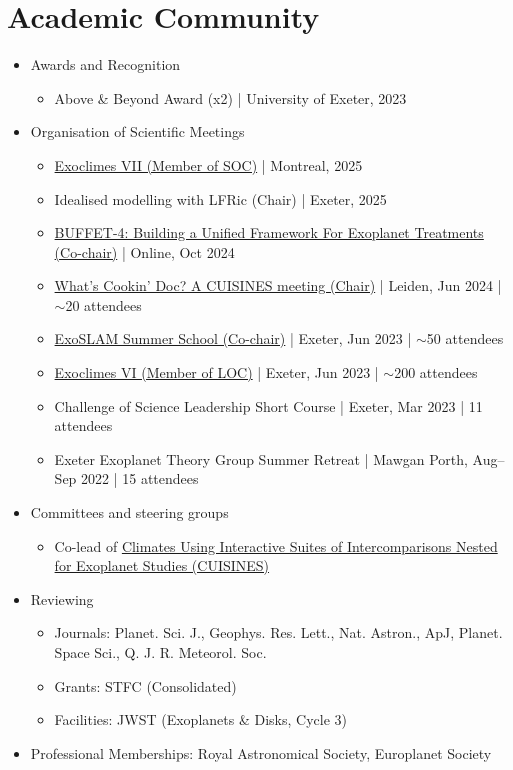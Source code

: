 \documentclass[a4paper, 11pt]{article}
\newcommand{\tbc}[1]{\textcolor{exeter_stone_grey}{#1}}
\begin{document}
\section{Academic Community}
\begin{itemize}[nosep, leftmargin=10pt]
    \item Awards and Recognition
    \begin{itemize}
        \item Above \& Beyond Award (x2) | University of Exeter, 2023
    \end{itemize}
    \item Organisation of Scientific Meetings
    \begin{itemize}
        \item \tbc{\href{https://exoclimes.org}{Exoclimes VII (Member of SOC)} | Montreal, 2025}
        \item \tbc{Idealised modelling with LFRic (Chair) | Exeter, 2025}
        \item \tbc{\href{https://nexss.info/buffet-4-in-october-22nd-and-23rd-2024/}{BUFFET-4: Building a Unified Framework For Exoplanet Treatments (Co-chair)} | Online, Oct 2024}
        \item \href{https://exoplanets5.org/splintersessions/}{What's Cookin' Doc? A CUISINES meeting (Chair)} | Leiden, Jun 2024 | $\sim$20 attendees
        \item \href{https://exoclim.github.ioexoclimes2023/exoslam/index.html}{ExoSLAM Summer School (Co-chair)} | Exeter, Jun 2023 | $\sim$50 attendees
        \item \href{https://exoclim.github.ioexoclimes2023}{Exoclimes VI (Member of LOC)} | Exeter, Jun 2023 | $\sim$200 attendees
        \item Challenge of Science Leadership Short Course | Exeter, Mar 2023 | 11 attendees
        \item Exeter Exoplanet Theory Group Summer Retreat | Mawgan Porth, Aug--Sep 2022 | 15 attendees
    \end{itemize}
    \item Committees and steering groups
    \begin{itemize}
        \item Co-lead of \href{https://nexss.info/cuisines}{Climates Using Interactive Suites of Intercomparisons Nested for Exoplanet Studies (CUISINES)}
    \end{itemize}
    \item Reviewing
    \begin{itemize}
        \item Journals: Planet. Sci. J., Geophys. Res. Lett., Nat. Astron., ApJ, Planet. Space Sci., Q. J. R. Meteorol. Soc.
        \item Grants: STFC (Consolidated)
        \item Facilities: JWST (Exoplanets \& Disks, Cycle 3)
    \end{itemize}
    \item Professional Memberships: Royal Astronomical Society, Europlanet Society
\end{itemize}
\end{document}
